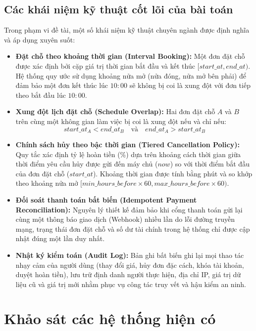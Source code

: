 \subsection{Các khái niệm kỹ thuật cốt lõi của bài toán}
Trong phạm vi đề tài, một số khái niệm kỹ thuật chuyên ngành được định nghĩa và áp dụng xuyên suốt:
\begin{itemize}
    \item \textbf{Đặt chỗ theo khoảng thời gian (Interval Booking):} Một đơn đặt chỗ được xác định bởi cặp giá trị thời gian bắt đầu và kết thúc $[start\_at, end\_at)$. Hệ thống quy ước sử dụng khoảng nửa mở (nửa đóng, nửa mở bên phải) để đảm bảo một đơn kết thúc lúc $10:00$ sẽ không bị coi là xung đột với đơn tiếp theo bắt đầu lúc $10:00$.
    \item \textbf{Xung đột lịch đặt chỗ (Schedule Overlap):} Hai đơn đặt chỗ $A$ và $B$ trên cùng một không gian làm việc bị coi là xung đột nếu và chỉ nếu:
    \begin{equation}
        start\_at_A < end\_at_B \quad \text{và} \quad end\_at_A > start\_at_B
        \label{eq:overlap}
    \end{equation}
    \item \textbf{Chính sách hủy theo bậc thời gian (Tiered Cancellation Policy):} Quy tắc xác định tỷ lệ hoàn tiền (\%) dựa trên khoảng cách thời gian giữa thời điểm yêu cầu hủy được gửi đến máy chủ ($now$) so với thời điểm bắt đầu của đơn đặt chỗ ($start\_at$). Khoảng thời gian được tính bằng phút và so khớp theo khoảng nửa mở $[min\_hours\_before \times 60, max\_hours\_before \times 60)$.
    \item \textbf{Đối soát thanh toán bất biến (Idempotent Payment Reconciliation):} Nguyên lý thiết kế đảm bảo khi cổng thanh toán gửi lại cùng một thông báo giao dịch (Webhook) nhiều lần do lỗi đường truyền mạng, trạng thái đơn đặt chỗ và số dư tài chính trong hệ thống chỉ được cập nhật đúng một lần duy nhất.
    \item \textbf{Nhật ký kiểm toán (Audit Log):} Bản ghi bất biến ghi lại mọi thao tác nhạy cảm của người dùng (thay đổi giá, hủy đơn đặc cách, khóa tài khoản, duyệt hoàn tiền), lưu trữ định danh người thực hiện, địa chỉ IP, giá trị dữ liệu cũ và giá trị mới nhằm phục vụ công tác truy vết và hậu kiểm an ninh.
\end{itemize}

\section{Khảo sát các hệ thống hiện có}
\label{sec:khaosat_hethong}

